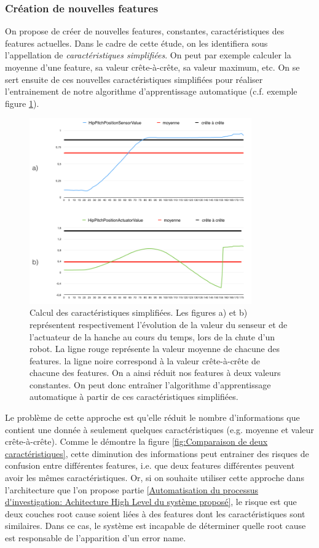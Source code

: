 \subsubsection{Création de nouvelles features}
\label{Automatisation du processus d'investigation: Reconnaissance de motifs: Différentes approches étudiées: Création de nouvelles features}
On propose de créer de nouvelles features, constantes, caractéristiques des features actuelles. Dans le cadre de cette étude, on les identifiera sous l'appellation de \emph{caractéristiques simplifiées}. On peut par exemple calculer la moyenne d'une feature, sa valeur crête-à-crête, sa valeur maximum, etc. On se sert ensuite de ces nouvelles caractéristiques simplifiées pour réaliser l'entrainement de notre algorithme d'apprentissage automatique (c.f. exemple figure \ref{fig:Calcul de nouvelles features}).

\begin{figure}[h]
	\centering\includegraphics[height=8cm]{images/caracteristiques_simples_1.png}
	\caption[Calcul des caractéristiques simplifiées]{Calcul des caractéristiques simplifiées. Les figures a) et b) représentent respectivement l'évolution de la valeur du senseur et de l'actuateur de la hanche au cours du temps, lors de la chute d'un robot. La ligne rouge représente la valeur moyenne de chacune des features. la ligne noire correspond à la valeur crête-à-crête de chacune des features. On a ainsi réduit nos features à deux valeurs constantes. On peut donc entraîner l'algorithme d'apprentissage automatique à partir de ces caractéristiques simplifiées.}
	\label{fig:Calcul de nouvelles features}
\end{figure}

Le problème de cette approche est qu'elle réduit le nombre d'informations que contient une donnée à seulement quelques caractéristiques (e.g. moyenne et valeur crête-à-crête). Comme le démontre la figure \ref{fig:Comparaison de deux caractéristiques}, cette diminution des informations peut entrainer des risques de confusion entre différentes features, i.e. que deux features différentes peuvent avoir les mêmes caractéristiques. Or, si on souhaite utiliser cette approche dans l'architecture que l'on propose partie \ref{Automatisation du processus d'investigation: Achitecture High Level du système proposé}, le risque est que deux couches root cause soient liées à des features dont les caractéristiques sont similaires. Dans ce cas, le système est incapable de déterminer quelle root cause est responsable de l'apparition d'un error name.

